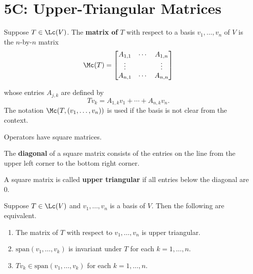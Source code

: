 \documentclass{extarticle}
\begin{document}

\newpage 
\section*{5C: Upper-Triangular Matrices}

\begin{definition}
    Suppose \(T \in \Lc(V)\). The \textbf{matrix of} \(T\) with respect to a basis 
    \(v_1, \ldots, v_n\) of \(V\) is the \(n\)-by-\(n\) matrix 
    \[\Mc(T) = \begin{bmatrix}
        A_{1,1} & \cdots & A_{1, n} \\ 
        \vdots &  & \vdots  \\ 
        A_{n, 1} & \cdots & A_{n,n}
    \end{bmatrix}\]

    whose entries \(A_{j, k}\) are defined by 
    \[Tv_k = A_{1, k}v_1 + \cdots + A_{n, k} v_n .\]
    The notation \(\Mc(T, (v_1, \ldots, v_n))\) is used if the basis is not clear from the context. 
\end{definition}

\begin{remark}
    Operators have square matrices.
\end{remark}

\begin{definition}
    The \textbf{diagonal} of a square matrix consists of the entries on the line from the upper left 
    corner to the bottom right corner. 
\end{definition}

\begin{definition}
    A square matrix is called \textbf{upper triangular} if all entries below the diagonal are 0.
\end{definition}

\begin{thm}
    Suppose \(T \in \Lc(V)\) and \(v_1, \ldots, v_n\) is a basis of \(V\). Then the following are 
    equivalent. 
    \begin{enumerate}[label=(\alph*)]
        \item The matrix of \(T\) with respect to \(v_1, \ldots, v_n\) is upper triangular. 
        \item \(\text{span}(v_1, \ldots, v_k)\) is invariant under \(T\) for each \(k = 1, \ldots, n\). 
        \item \(Tv_k \in \text{span}(v_1, \ldots, v_k)\) for each \(k = 1, \ldots, n\). 
    \end{enumerate}
\end{thm}
\end{document}
